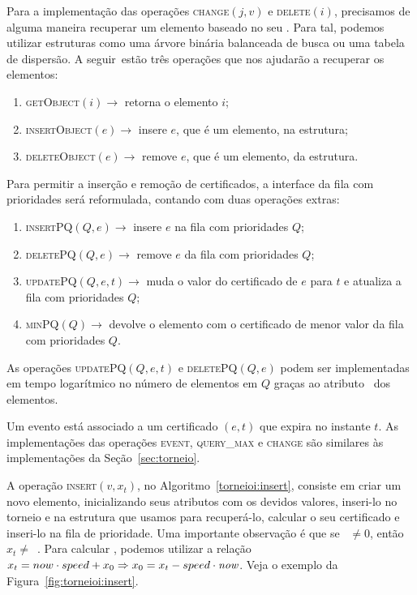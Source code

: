 Para a implementação das operações \textsc{change}$(j, v)$ e \textsc{delete}$(i)$, precisamos de
alguma maneira recuperar um elemento baseado no seu \id.
Para tal, podemos utilizar estruturas como uma árvore binária balanceada de busca ou uma tabela de
dispersão.
A seguir~estão três operações que nos ajudarão a recuperar os elementos:
\begin{enumerate}
    \item \textsc{getObject}$(i)\rightarrow$ retorna o elemento $i$;
    \item \textsc{insertObject}$(e) \rightarrow$ insere $e$, que é
    um elemento, na estrutura;
    \item \textsc{deleteObject}$(e) \rightarrow$ remove $e$, que é
    um elemento, da estrutura.
\end{enumerate}
Para permitir a inserção e remoção de certificados, a interface da fila com prioridades será
reformulada, contando com duas operações extras:
\begin{enumerate}
    \item \textsc{insertPQ}$(Q, e) \rightarrow$ insere $e$ na fila
    com prioridades $Q$;
    \item \textsc{deletePQ}$(Q, e) \rightarrow$ remove $e$ da fila
    com prioridades $Q$;
    \item \textsc{updatePQ}$(Q,e,t) \rightarrow$ muda o valor do
    certificado de $e$ para $t$ e atualiza a fila com prioridades
    $Q$;
    \item \textsc{minPQ}$(Q) \rightarrow$ devolve o elemento com o
    certificado de menor valor da fila com prioridades $Q$.
\end{enumerate}
As operações \textsc{updatePQ}$(Q,e,t)$ e \textsc{deletePQ}$(Q, e)$ podem ser implementadas em
tempo logarítmico no número de elementos em $Q$ graças ao atributo \pqpos~dos elementos.

Um evento está associado a um certificado $(e, t)$ que expira no instante $t$.
As implementações das operações \textsc{event}, \textsc{query\_max} e \textsc{change} são
similares às implementações da Seção~\ref{sec:torneio}.



A operação \textsc{insert}$(v, x_t)$, no Algoritmo~\ref{torneioi:insert}, consiste em criar um
novo elemento, inicializando seus atributos com os devidos valores, inseri-lo no torneio e na
estrutura que usamos para recuperá-lo, calcular o seu certificado e inseri-lo na fila de
prioridade.
Uma importante observação é que se \now~$\neq 0$, então $x_t \neq$~\initv.
Para calcular \initv, podemos utilizar a relação $x_t = now\cdot speed + x_0 \Rightarrow x_0 = x_t
- speed\cdot\textit{now}$.
Veja o exemplo da Figura~\ref{fig:torneioi:insert}.

